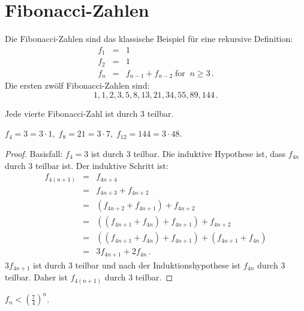 
\section{Fibonacci-Zahlen}\label{s.induction-fibonacci}
Die Fibonacci-Zahlen sind das klassische Beispiel für eine rekursive Definition:
\begin{eqnarray*}
f_1 &=& 1\\
f_2 &=& 1\\
f_n &=& f_{n-1} + f_{n-2}\; \textrm{for} \;\; n \geq 3\,.
\end{eqnarray*}
Die ersten zwölf Fibonacci-Zahlen sind:
\[
1, 1, 2, 3, 5, 8, 13, 21, 34, 55, 89, 144\,.
\]
\begin{theorem}\label{thm.fib-div3}
Jede vierte Fibonacci-Zahl ist durch $3$ teilbar.
\end{theorem}

\begin{example}
$f_4=3=3\cdot 1,\; f_8=21=3\cdot 7,\; f_{12}=144=3\cdot 48$.
\end{example}

\begin{proof}
Basisfall: $f_4=3$ ist durch $3$ teilbar. Die induktive Hypothese ist, dass $f_{4n}$ durch $3$ teilbar ist. Der induktive Schritt ist:
\begin{eqnarray*}
f_{4(n+1)} &=& f_{4n+4}\\
&=& f_{4n+3}+f_{4n+2}\\
&=& (f_{4n+2}+f_{4n+1})+f_{4n+2}\\
&=& ((f_{4n+1}+f_{4n})+f_{4n+1})+f_{4n+2}\\
&=& ((f_{4n+1}+f_{4n})+f_{4n+1})+(f_{4n+1}+f_{4n})\\
&=& 3f_{4n+1}+2f_{4n}\,.
\end{eqnarray*}
$3f_{4n+1}$ ist durch $3$ teilbar und nach der Induktionshypothese ist $f_{4n}$ durch $3$ teilbar. Daher ist $f_{4(n+1)}$ durch $3$ teilbar.
\end{proof}

\begin{theorem}\label{thm.seven-fourths}
$f_n < \left(\displaystyle\frac{7}{4}\right)^n$.
\end{theorem}

